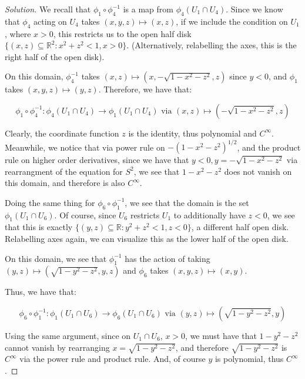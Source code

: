 \documentclass[10pt]{article}
\begin{document}
\begin{proof}[Solution]

We recall that $\phi_1 \circ \phi_4^{-1}$ is a map from $\phi_4(U_1 \cap U_4)$. Since we know that $\phi_4$ acting on $U_4$ takes $(x,y,z) \mapsto (x,z)$, if we include the condition on $U_1$, where $x > 0$, this restricts us to the open half disk $\{ (x,z) \subseteq \mathbb{R}^2 : x^2 + z^2 < 1, x > 0 \}$. (Alternatively, relabelling the axes, this is the right half of the open disk).

On this domain, $\phi_4^{-1}$ takes $(x,z) \mapsto (x,-\sqrt{1 - x^2 - z^2}, z)$ since $y < 0$, and $\phi_1$ takes $(x,y,z) \mapsto (y,z)$. Therefore, we have that:

$$\phi_1 \circ \phi_4^{-1}: \phi_4(U_1 \cap U_4) \to \phi_1(U_1 \cap U_4) \text{ via } (x,z) \mapsto (-\sqrt{1 - x^2 - z^2}, z) $$

Clearly, the coordinate function $z$ is the identity, thus polynomial and $C^\infty$. Meanwhile, we notice that via power rule on $-(1 - x^2 - z^2)^{1/2}$, and the product rule on higher order derivatives, since we have that $y < 0, y= - \sqrt{1 - x^2 - z^2}$ via rearrangment of the equation for $S^2$, we see that $1 - x^2 - z^2$ does not vanish on this domain, and therefore is also $C^\infty$.

Doing the same thing for $\phi_6 \circ \phi_1^{-1}$, we see that the domain is the set  $\phi_1(U_1 \cap U_6)$. Of course, since $U_6$ restricts $U_1$ to additionally have $z < 0$, we see that this is exactly $\{ (y,z) \subseteq \mathbb{R} : y^2 + z^2 < 1, z < 0 \}$, a different half open disk. Relabelling axes again, we can visualize this as the lower half of the open disk.

On this domain, we see that $\phi_1^{-1}$ has the action of taking $(y,z) \mapsto (\sqrt{1 - y^2 - z^2}, y,z)$ and $\phi_6$ takes $(x,y,z) \mapsto (x,y)$.

Thus, we have that:

$$\phi_6 \circ \phi_1^{-1}: \phi_1(U_1 \cap U_6) \to \phi_6(U_1 \cap U_6) \text{ via } (y,z) \mapsto (\sqrt{1 - y^2 - z^2}, y)$$

Using the same argument, since on $U_1 \cap U_6$, $x > 0$, we must have that $1 - y^2 - z^2$ cannot vanish by rearranging $x = \sqrt{1 - y^2 - z^2}$, and therefore $\sqrt{1 - y^2 - z^2}$ is $C^\infty$ via the power rule and product rule. And, of course $y$ is polynomial, thus $C^\infty$. 

\end{proof}
\end{document}
